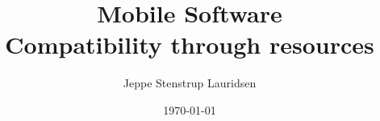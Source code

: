 \documentclass[12pt]{article}
\title{%
Mobile Software \\
\large Compatibility through resources}
\author{Jeppe Stenstrup Lauridsen}
\date{\today}
\begin{document}
\begin{titlepage}
\clearpage\maketitle
\thispagestyle{empty}
\end{titlepage}


\end{document}
